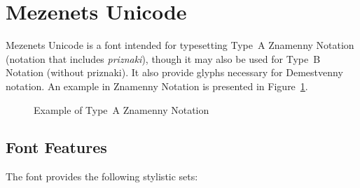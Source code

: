 \documentclass[11pt]{article}
\begin{document}
\section{Mezenets Unicode}

Mezenets Unicode is a font intended for typesetting Type~A Znamenny Notation (notation
that includes \emph{priznaki}), though it may also be used for Type~B Notation (without
priznaki). It also provide glyphs necessary for Demestvenny notation. An example in
Znamenny Notation is presented in Figure~\ref{mezenets}.

\begin{figure}[tbp]
\begin{churchslavonic}
\noindent
{}
\end{churchslavonic}
\caption{Example of Type~A Znamenny Notation \label{mezenets}}
\end{figure}

\subsection{Font Features}

The font provides the following stylistic sets:
\end{document}
